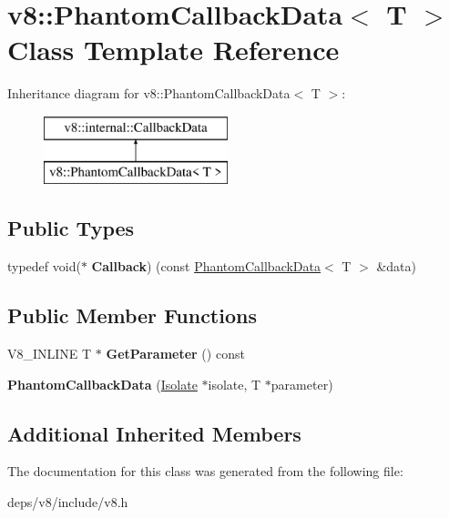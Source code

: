 \hypertarget{classv8_1_1_phantom_callback_data}{}\section{v8\+:\+:Phantom\+Callback\+Data$<$ T $>$ Class Template Reference}
\label{classv8_1_1_phantom_callback_data}
Inheritance diagram for v8\+:\+:Phantom\+Callback\+Data$<$ T $>$\+:\begin{figure}[H]
\begin{center}
\leavevmode
\includegraphics[height=2.000000cm]{classv8_1_1_phantom_callback_data}
\end{center}
\end{figure}
\subsection*{Public Types}
\begin{DoxyCompactItemize}
\item 
\hypertarget{classv8_1_1_phantom_callback_data_abc9d3785b5329fa1163003b9691b1346}{}typedef void($\ast$ {\bfseries Callback}) (const \hyperlink{classv8_1_1_phantom_callback_data}{Phantom\+Callback\+Data}$<$ T $>$ \&data)\label{classv8_1_1_phantom_callback_data_abc9d3785b5329fa1163003b9691b1346}

\end{DoxyCompactItemize}
\subsection*{Public Member Functions}
\begin{DoxyCompactItemize}
\item 
\hypertarget{classv8_1_1_phantom_callback_data_a0cd118d7190d55e57cee3883ee778d0a}{}V8\+\_\+\+I\+N\+L\+I\+N\+E T $\ast$ {\bfseries Get\+Parameter} () const \label{classv8_1_1_phantom_callback_data_a0cd118d7190d55e57cee3883ee778d0a}

\item 
\hypertarget{classv8_1_1_phantom_callback_data_aef91acbfed893aec03ae24f3f7ad7a58}{}{\bfseries Phantom\+Callback\+Data} (\hyperlink{classv8_1_1_isolate}{Isolate} $\ast$isolate, T $\ast$parameter)\label{classv8_1_1_phantom_callback_data_aef91acbfed893aec03ae24f3f7ad7a58}

\end{DoxyCompactItemize}
\subsection*{Additional Inherited Members}


The documentation for this class was generated from the following file\+:\begin{DoxyCompactItemize}
\item 
deps/v8/include/v8.\+h\end{DoxyCompactItemize}
